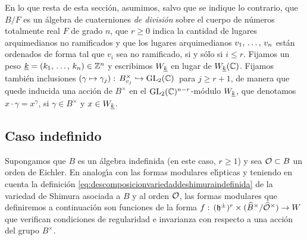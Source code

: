 En lo que resta de esta secci\'{o}n, asumimos, salvo que se indique lo
contrario, que $B/F$ es un \'{a}lgebra de cuaterniones \emph{de %
divisi\'{o}n} sobre el cuerpo de n\'{u}meros totalmente real $F$ de grado $n$,
que $r\geq 0$ indica la cantidad de lugares arquimedianos no ramificados y que
los lugares arquimedianos $\lista{v}{n}$ est\'{a}n ordenados de forma tal que
$v_{i}$ sea no ramificado, si y s\'{o}lo si $i\leq r$. Fijamos un peso
$\peso{k}=(\lista{k}{n})\in\bb{Z}^{n}$ y escribimos $W_{\peso{k}}$ en lugar de
$W_{\peso{k}}(\bb{C})$. Fijamos tambi\'{e}n inclusiones
\begin{math}
	(\gamma\mapsto\gamma_{j}):\,
		B_{v_{j}}^{\times}\hookrightarrow\GL_{2}(\bb{C})
\end{math}~para $j\geq r+1$, de manera que quede inducida una acci\'{o}n de
$B^{\times}$ en el $\GL_{2}(\bb{C})^{n-r}$-m\'{o}dulo $W_{\peso{k}}$, que
denotamos $x\cdot\gamma=x^{\gamma}$, si $\gamma\in B^{\times}$ y
$x\in W_{\peso{k}}$.

\subsection{Caso indefinido}%
Supongamos que $B$ es un \'{a}lgebra indefinida (en este caso, $r\geq 1$) y
sea $\cal{O}\subset B$ un orden de Eichler. En analog\'{\i}a con las formas
modulares el\'{\i}pticas y teniendo en cuenta la definici\'{o}n
\eqref{eq:descomposicionvariedaddeshimuraindefinida} de la variedad de Shimura
asociada a $B$ y al orden $\cal{O}$, las formas modulares que definiremos a
continuaci\'{o}n son funciones de la forma
\begin{math}
	f:\,(\hP^{\pm})^{r}\times(\Idfin{B}/\Idfin{\cal{O}})\rightarrow W
\end{math}
que verifican condiciones de regularidad e invarianza con respecto a una
acci\'{o}n del grupo $B^{\times}$.

